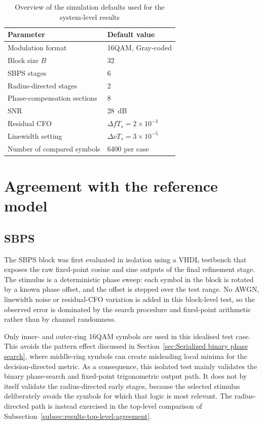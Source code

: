 \begin{table}[H]
\centering
\caption{Overview of the simulation defaults used for the system-level results}
\label{tab:results-case-matrix}
\begin{tabular}{l l}
\hline
Parameter & Default value \\
\hline
Modulation format & \ac{16QAM}, Gray-coded \\
Block size \(B\) & 32 \\
\ac{SBPS} stages & 6 \\
Radius-directed stages & 2 \\
Phase-compensation sections & 8 \\
\ac{SNR} &  28~dB \\
Residual \ac{CFO} & $\Delta f T_s = 2\times10^{-3}$ \\
Linewidth setting & $\Delta \nu T_s = 3\times10^{-5}$ \\
Number of compared symbols & 6400 per case \\
\hline
\end{tabular}
\end{table}

\section{Agreement with the reference model}

\subsection{SBPS}
The \ac{SBPS} block was first evaluated in isolation using a VHDL testbench that exposes the raw fixed-point cosine and sine outputs of the final refinement stage. The stimulus is a deterministic phase sweep: each symbol in the block is rotated by a known phase offset, and the offset is stepped over the test range. No \ac{AWGN}, linewidth noise or residual-\ac{CFO} variation is added in this block-level test, so the observed error is dominated by the search procedure and fixed-point arithmetic rather than by channel randomness.

Only inner- and outer-ring \ac{16QAM} symbols are used in this idealised test case. This avoids the pattern effect discussed in Section~\ref{sec:Serialized binary phase search}, where middle-ring symbols can create misleading local minima for the decision-directed metric. As a consequence, this isolated test mainly validates the binary phase-search and fixed-point trigonometric output path. It does not by itself validate the radius-directed early stages, because the selected stimulus deliberately avoids the symbols for which that logic is most relevant. The radius-directed path is instead exercised in the top-level comparison of Subsection~\ref{subsec:results-top-level-agreement}.

